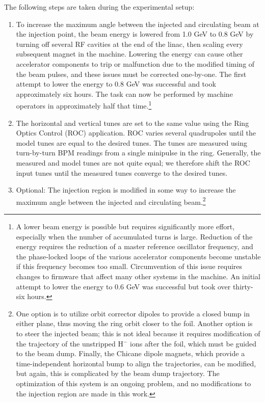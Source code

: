 The following steps are taken during the experimental setup:
%
\begin{enumerate}
    \item 
    To increase the maximum angle between the injected and circulating beam at the injection point, the beam energy is lowered from 1.0 GeV to 0.8 GeV by turning off several RF cavities at the end of the linac, then scaling every subsequent magnet in the machine. Lowering the energy can cause other accelerator components to trip or malfunction due to the modified timing of the beam pulses, and these issues must be corrected one-by-one. The first attempt to lower the energy to 0.8 GeV was successful and took approximately six hours. The task can now be performed by machine operators in approximately half that time.\footnote{A lower beam energy is possible but requires significantly more effort, especially when the number of accumulated turns is large. Reduction of the energy requires the reduction of a master reference oscillator frequency, and the phase-locked loops of the various accelerator components become unstable if this frequency becomes too small. Circumvention of this issue requires changes to firmware that affect many other systems in the machine. An initial attempt to lower the energy to 0.6 GeV was successful but took over thirty-six hours.}
    \item
    The horizontal and vertical tunes are set to the same value using the Ring Optics Control (ROC) application. ROC varies several quadrupoles until the model tunes are equal to the desired tunes. The tunes are measured using turn-by-turn BPM readings from a single minipulse in the ring. Generally, the measured and model tunes are not quite equal; we therefore shift the ROC input tunes until the measured tunes converge to the desired tunes. 
    \item
    Optional: The injection region is modified in some way to increase the maximum angle between the injected and circulating beam.\footnote{One option is to utilize orbit corrector dipoles to provide a closed bump in either plane, thus moving the ring orbit closer to the foil. Another option is to steer the injected beam; this is not ideal because it requires modification of the trajectory of the unstripped H$^-$ ions after the foil, which must be guided to the beam dump. Finally, the Chicane dipole magnets, which provide a time-independent horizontal bump to align the trajectories, can be modified, but again, this is complicated by the beam dump trajectory. The optimization of this system is an ongoing problem, and no modifications to the injection region are made in this work.}

\end{enumerate}
